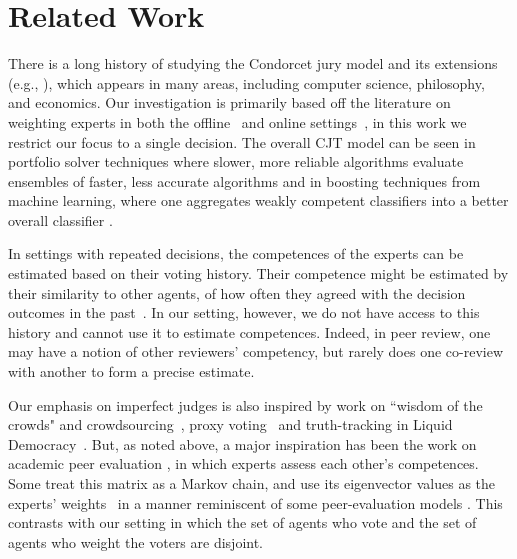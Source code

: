 \documentclass[letterpaper]{article} %
\begin{document}
\section{Related Work}
%
There is a long history of studying the Condorcet jury model and its extensions (e.g., \citet{berend1998condorcet,ben2000nonasymptotic,grofman1978judgmental,feld1984accuracy}), which appears in many areas, including computer science, philosophy, and economics. Our investigation is primarily based off the literature on weighting experts in both the offline~\cite{shapley1984optimizing,nitzan1982optimal} and online settings~\cite{cesa1997use,vovk1990aggregating,freeman2020no, berend2015finite}, in this work we restrict our focus to a single decision. The overall CJT model can be seen in portfolio solver techniques where slower, more reliable algorithms evaluate ensembles of faster, less accurate algorithms \cite{thornton2013auto} and in boosting techniques from machine learning, where one aggregates weakly competent classifiers into a better overall classifier \cite{schapire2013boosting}.

In settings with repeated decisions, the competences of the experts can be estimated based on their voting history. Their competence might be estimated by their similarity to other agents, of how often they agreed with the decision outcomes in the past~\cite{grofman1983thirteen,baharad2012beyond,romeijn2011learning}. In our setting, however, we do not have access to this history and cannot use it to estimate competences. Indeed, in peer review, one may have a notion of other reviewers' competency, but rarely does one co-review with another to form a precise estimate.%

Our emphasis on imperfect judges is also inspired by work on ``wisdom of the crowds" and crowdsourcing~\cite{surowiecki2005wisdom,brabham2013using,brabham2015crowdsourcing}, proxy voting~\cite{abramowitz2019flexible,pivato2020weighted} and truth-tracking in Liquid Democracy~\cite{zhang2022tracking,becker2021unveiling}. But, as noted above, a major inspiration has been the work on academic peer evaluation \cite{Shah22CACM}, in which experts assess each other's competences. Some treat this matrix as a Markov chain, and use its eigenvector values as the experts' weights~\cite{grofman1983determining} in a manner reminiscent of some peer-evaluation models \cite{page1999pagerank,Wal14,LMTZ23}. 
%
This contrasts with our setting in which the set of agents who vote and the set of agents who weight the voters are disjoint.
 
\end{document}
